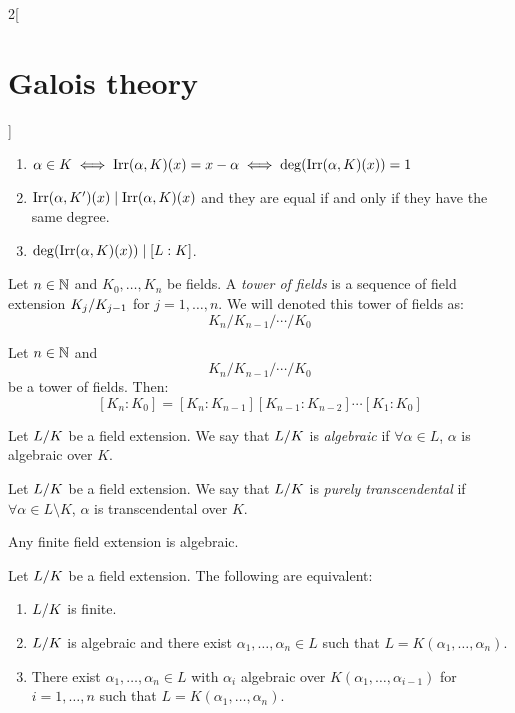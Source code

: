 \documentclass[../../../main.tex]{subfiles}
\begin{document}
\begin{multicols}{2}[\section{Galois theory}]
\begin{prop}
\begin{enumerate}
      \item $\alpha\in K\iff\operatorname{Irr}(\alpha,K)(x)=x-\alpha\iff \deg(\operatorname{Irr}(\alpha,K)(x))=1$
      \item $\operatorname{Irr}(\alpha,K')(x)\mid\operatorname{Irr}(\alpha,K)(x)$ and they are equal if and only if they have the same degree.
      \item $\deg(\operatorname{Irr}(\alpha,K)(x))\mid [L:K]$.
    \end{enumerate}
  \end{prop}
  \begin{definition}
    Let $n\in\mathbb{N}$ and $K_0,\ldots,K_n$ be fields. A \textit{tower of fields} is a sequence of field extension $\quot{K_j}{K_{j-1}}$ for $j=1,\ldots,n$. We will denoted this tower of fields as: $$K_n/K_{n-1}/\cdots/K_0$$
  \end{definition}
  \begin{corollary}
    Let $n\in\mathbb{N}$ and $$K_n/K_{n-1}/\cdots/K_0$$ be a tower of fields. Then: $$[K_n:K_0]=[K_n:K_{n-1}][K_{n-1}:K_{n-2}]\cdots[K_1:K_0]$$
  \end{corollary}
  \begin{definition}
    Let $\quot{L}{K}$ be a field extension. We say that $\quot{L}{K}$ is \textit{algebraic} if $\forall\alpha\in L$, $\alpha$ is algebraic over $K$.
  \end{definition}
  \begin{definition}
    Let $\quot{L}{K}$ be a field extension. We say that $\quot{L}{K}$ is \textit{purely transcendental} if $\forall\alpha\in L\setminus K$, $\alpha$ is transcendental over $K$.
  \end{definition}
  \begin{lemma}
    Any finite field extension is algebraic.
  \end{lemma}
  \begin{prop}
    Let $\quot{L}{K}$ be a field extension. The following are equivalent:
    \begin{enumerate}
      \item $\quot{L}{K}$ is finite.
      \item $\quot{L}{K}$ is algebraic and there exist $\alpha_1,\ldots,\alpha_n\in L$ such that $L=K(\alpha_1,\ldots,\alpha_n)$.
      \item There exist $\alpha_1,\ldots,\alpha_n\in L$ with $\alpha_i$ algebraic over $K(\alpha_1,\ldots,\alpha_{i-1})$ for $i=1,\ldots,n$ such that $L=K(\alpha_1,\ldots,\alpha_n)$.
    \end{enumerate}
  \end{prop}
  \begin{prop}

\end{prop}
\end{multicols}
\end{document}
